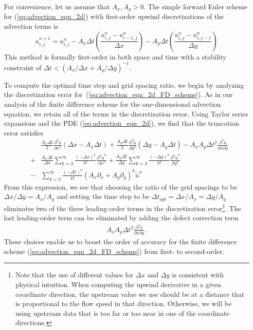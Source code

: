 \documentclass[fleqn,12pt,twoside]{article}
\newcommand{\beq}{\begin{equation}}
\newcommand{\eeq}{\end{equation}}
\newcommand{\bea}{\begin{eqnarray}}
\newcommand{\eea}{\end{eqnarray}}
\def\px{\partial x}
\def\py{\partial y}
\def\tu{\tilde{u}}
\def\dt{\Delta t}
\def\dx{\Delta x}
\def\dy{\Delta y}
\begin{document}
For convenience, let us assume that $A_x, A_y > 0$.  The simple forward Euler 
scheme for (\ref{eq:advection_eqn_2d}) with first-order upwind discretizations 
of the advection terms is 
\beq
  u^{n+1}_{i,j} = u^{n}_{i,j}
  - A_x \dt \left( \frac{u^{n}_{i,j} - u^{n}_{i-1,j}}{\dx} \right)
  - A_y \dt \left( \frac{u^{n}_{i,j} - u^{n}_{i,j-1}}{\dy} \right)
  \label{eq:advection_eqn_2d_FD_scheme}
\eeq
This method is formally first-order in both space and time with a 
stability constraint of $\dt < \left( A_x/\dx + A_y/\dy \right)^{-1}$.

To compute the optimal time step and grid spacing ratio, we begin by analyzing 
the discretization error 
for~(\ref{eq:advection_eqn_2d_FD_scheme}).  As in our analysis of the finite
difference scheme for the one-dimensional advection equation, we retain all of 
the terms in the discretization error.  Using Taylor series expansions and
the PDE (\ref{eq:advection_eqn_2d}), we find that the truncation error 
satisfies
\bea
  & &
      \frac{A_x \dt}{2} \frac{\partial^2 \tu}{\px^2}
      \left( \dx - A_x \dt \right)
    + \frac{A_y \dt}{2} \frac{\partial^2 \tu}{\py^2}
      \left( \dy - A_y \dt \right)
    - A_x A_y \dt^2 \frac{\partial^2 \tu}{\px \py}
   \nonumber \\
   &+& \frac{A_x\dt}{\dx} \sum_{k=3}^\infty \frac{\left( -\dx \right)^k}{k!} 
       \frac{\partial^k \tu^n}{\px^k} 
   + \frac{A_y\dt}{\dy} \sum_{k=3}^\infty \frac{\left( -\dy \right)^k}{k!} 
       \frac{\partial^k \tu^n}{\py^k} 
   \nonumber \\
   &-& \sum_{k=3}^\infty \frac{\left( -\dt \right)^k}{k!} 
       \left( A_x \partial_x + A_y \partial_y
              \right)^k \tu^{n} 
  \label{eq:advection_eqn_2d_trunc_err}
\eea
From this expression, we see that choosing the ratio of the grid spacings to
be $\dx/\dy = A_x/A_y$ and setting the time step to be 
$\dt_{opt} = \dx/A_x = \dy/A_y$ eliminates two of the three leading-order 
terms in the discretization error\footnote{Note that the use of different 
values for $\dx$ and $\dy$ is consistent with physical intuition.  When 
computing the upwind derivative in a given coordinate direction, the upstream 
value we use should be at a distance that is proportional to the flow speed in 
that direction.  Otherwise, we will be using upstream data that is too far or 
too near in one of the coordinate directions.}.
The last leading-order term can be eliminated by adding the defect correction 
term
\bea
   A_x A_y \dt^2 \frac{\partial^2 \tu}{\px \py}.
  \label{eq:advection_eqn_2d_corr_term}
\eea
These choices enable us to boost the order of accuracy for the finite 
difference scheme (\ref{eq:advection_eqn_2d_FD_scheme}) from first- to 
second-order.
\end{document}
